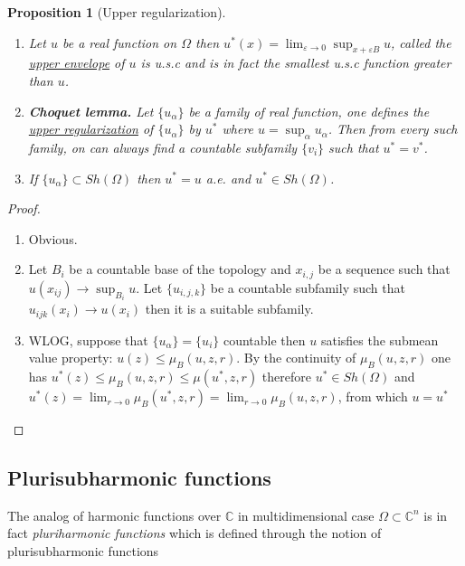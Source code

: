 \documentclass[11pt]{article}
\newtheorem{proposition}{Proposition}[theorem]
\begin{document}
\begin{proposition}[Upper regularization]
\label{prop:upper-regularization}
\begin{enumerate}
\item Let \(u\) be a real function on \(\Omega\) then \(u^*(x) = \lim_{\varepsilon\to 0}
   \sup_{x+\varepsilon B} u\), called the \uline{upper envelope} of \(u\) is u.s.c and is in
fact the smallest u.s.c function greater than \(u\).
\item \textbf{Choquet lemma.} Let \(\{u_\alpha\}\) be a family of real function, one defines the
\uline{upper regularization} of \(\{ u_\alpha\}\) by \(u^*\) where \(u=\sup_\alpha u_\alpha\). Then from every such family, on can always find a countable subfamily \(\{v_i\}\)
such that \(u^* = v^*\).
\item If \(\{u_{\alpha}\} \subset Sh(\Omega)\) then \(u^* = u\) a.e. and \(u^*\in Sh(\Omega)\).
\end{enumerate}
\end{proposition}
\begin{proof}
\begin{enumerate}
\item Obvious.
\item Let \(B_i\) be a countable base of the topology and \(x_{i,j}\) be a sequence such
that \(u(x_{ij}) \to \sup_{B_i}u\). Let \(\{ u_{i,j,k} \}\) be a countable subfamily
such that \(u_{ijk}(x_i) \to u(x_i)\) then it is a suitable subfamily.
\item WLOG, suppose that \(\{u_\alpha\} = \{u_i\}\) countable then \(u\) satisfies the
submean value property: \(u(z)\leq \mu_B(u,z,r)\). By the continuity of \(\mu_B(u,z,r)\) one has \(u^*(z)\leq \mu_B(u,z,r)\leq \mu(u^*,z,r)\) therefore \(u^*\in
   Sh(\Omega)\) and \(u^*(z) = \lim_{r\to 0} \mu_B(u^*,z,r) = \lim_{r\to 0}\mu_B(u,z,r)\), from which \(u=u^*\)
\end{enumerate}
\end{proof}

\subsection{Plurisubharmonic functions}
\label{sec:orgd6dc923}

The analog of harmonic functions over \(\mathbb{C}\) in multidimensional case \(\Omega\subset \mathbb{C}^n\) is in fact
\emph{pluriharmonic functions} which is defined through the notion of plurisubharmonic functions
\end{document}
